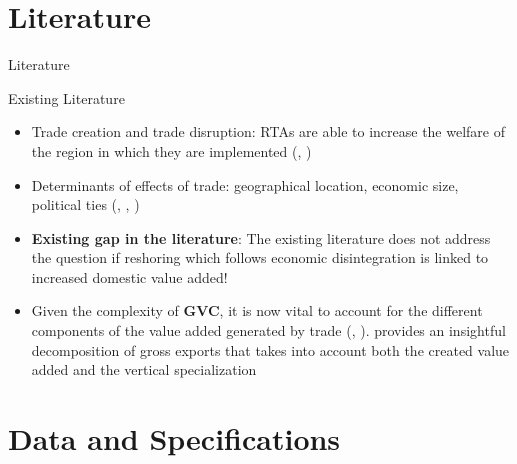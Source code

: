 \documentclass[10pt]{beamer}
\begin{document}
\section{Literature}

\begin{frame}[fragile]{Literature}

 Existing Literature
      \begin{itemize}
        \item Trade creation and trade disruption: RTAs are able to increase the welfare of the region in which they are implemented (\cite{baier2007free}, \cite{mayer2019cost}) 
	\item Determinants of effects of trade: geographical location, economic size, political ties (\cite{felbermayr2018schengen}, \cite{felbermayr2022complex}, \cite{baier2019putting})
	\item \textbf{Existing gap in the literature}: The existing literature does not address the question if reshoring which follows economic disintegration is linked to increased domestic value added!
	\item Given the complexity of \textbf{GVC}, it is now vital to account for the different components of the value added generated by trade (\cite{antras2021global}, \cite{aslam2017calculating}). \cite{koopman2014tracing} provides an insightful decomposition of gross exports that takes into account both the created value added and the vertical specialization
      \end{itemize}

\end{frame}


\section{Data and Specifications}
\end{document}
